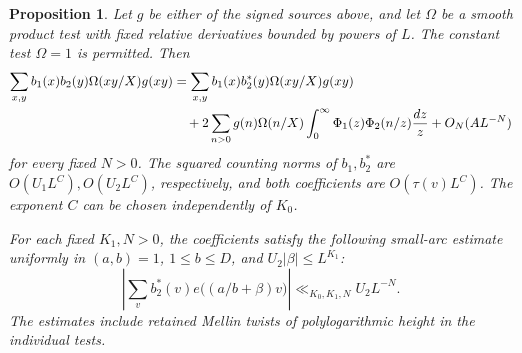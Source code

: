 \documentclass[11pt,a4paper]{article}
\theoremstyle{paperplain}
\newtheorem{proposition}[theorem]{Proposition}
\numberwithin{equation}{section}
\begin{document}
\begin{proposition}\label{octal:principal-grouped-model}
Let $g$ be either of the signed sources above, and let $\Omega$ be a
smooth product test with fixed relative derivatives bounded by powers
of $L$. The constant test $\Omega=1$ is permitted. Then
\begin{align}
 \sum_{x,y} b_1(x)b_2(y)\Omega(xy/X)g(xy)
 &=\sum_{x,y} b_1(x)b_2^*(y)\Omega(xy/X)g(xy)\notag\\
 &\quad+2\sum_{n>0}g(n)\Omega(n/X)
                 \int_0^\infty \Phi_1(z)\Phi_2(n/z)\frac{dz}{z}
       +O_N(AL^{-N})                                           \label{eq:principal-grouped-representation}
\end{align}
for every fixed $N>0$. The squared counting norms of $b_1,b_2^*$ are
$O(U_1L^C),O(U_2L^C)$, respectively, and both coefficients are
$O(\tau(v)L^C)$. The exponent $C$ can be chosen independently of $K_0$.

For each fixed $K_1,N>0$, the coefficients satisfy the following
small-arc estimate uniformly in $(a,b)=1$, $1\le b\le D$, and
$U_2|\beta|\le L^{K_1}$:
\begin{equation}\label{eq:principal-grouped-low-arc}
 \left|\sum_v b_2^*(v)e\bigl((a/b+\beta)v\bigr)\right|
                    \ll_{K_0,K_1,N} U_2L^{-N}.
\end{equation}
The estimates include retained Mellin twists of polylogarithmic
height in the individual tests.
\end{proposition}
\end{document}
